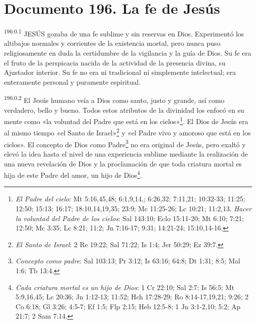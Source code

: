 \chapter{Documento 196. La fe de Jesús}
\par
\textsuperscript{196:0.1} JESÚS gozaba de una fe sublime y sin reservas en Dios. Experimentó los altibajos normales y corrientes de la existencia mortal, pero nunca puso religiosamente en duda la certidumbre de la vigilancia y la guía de Dios. Su fe era el fruto de la perspicacia nacida de la actividad de la presencia divina, su Ajustador interior. Su fe no era ni tradicional ni simplemente intelectual; era enteramente personal y puramente espiritual.

\par
\textsuperscript{196:0.2} El Jesús humano veía a Dios como santo, justo y grande, así como verdadero, bello y bueno. Todos estos atributos de la divinidad los enfocó en su mente como «la voluntad del Padre que está en los cielos»\footnote{\textit{El Padre del cielo}: Mt 5:16,45,48; 6:1,9,14,; 6:26,32; 7:11,21; 10:32-33; 11:25; 12:50; 15:13; 16:17; 18:10,14,19,35; 23:9; Mc 11:25-26; Lc 10:21; 11:2,13. \textit{Hacer la voluntad del Padre de los cielos}: Sal 143:10; Eclo 15:11-20; Mt 6:10; 7:21; 12:50; Mc 3:35; Lc 8:21; 11:2; Jn 7:16-17; 9:31; 14:21-24; 15:10,14-16.}. El Dios de Jesús era al mismo tiempo «el Santo de Israel»\footnote{\textit{El Santo de Israel}: 2 Re 19:22; Sal 71:22; Is 1:4; Jer 50:29; Ez 39:7.} y «el Padre vivo y amoroso que está en los cielos». El concepto de Dios como Padre\footnote{\textit{Concepto como padre}: Sal 103:13; Pr 3:12; Is 63:16; 64:8; Dt 1:31; 8:5; Mal 1:6; Tb 13:4.} no era original de Jesús, pero exaltó y elevó la idea hasta el nivel de una experiencia sublime mediante la realización de una nueva revelación de Dios y la proclamación de que toda criatura mortal es hija de este Padre del amor, un hijo de Dios\footnote{\textit{Cada criatura mortal es un hijo de Dios}: 1 Cr 22:10; Sal 2:7; Is 56:5; Mt 5:9,16,45; Lc 20:36; Jn 1:12-13; 11:52; Hch 17:28-29; Ro 8:14-17,19,21; 9:26; 2 Co 6:18; Gl 3:26; 4:5-7; Ef 1:5; Flp 2:15; Heb 12:5-8; 1 Jn 3:1-2,10; 5:2; Ap 21:7; 2 Sam 7:14.}.


